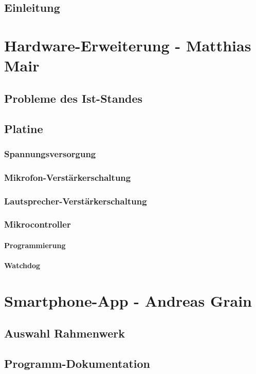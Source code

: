 \documentclass[a4paper, 12pt, twoside, openright
]{memoir}
\begin{document}
\mainmatter
\chapter{Einleitung}


\part{Hardware-Erweiterung - Matthias Mair}
\cleartoverso
\chapter{Probleme des Ist-Standes}
\chapter{Platine}
\section{Spannungsversorgung}
\section{Mikrofon-Verstärkerschaltung}
\section{Lautsprecher-Verstärkerschaltung}
\section{Mikrocontroller}
\subsection{Programmierung}
\subsection{Watchdog}

\part{Smartphone-App - Andreas Grain}
\chapter{Auswahl Rahmenwerk}

\chapter{Programm-Dokumentation}

\end{document}
